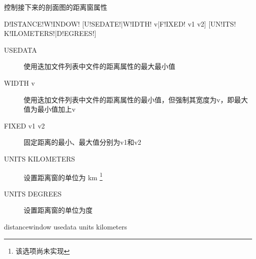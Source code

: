 \label{sss:distancewindow}

控制接下来的剖面图的距离窗属性

\begin{SACSTX}
D!ISTANCE!W!INDOW! [U!SEDATE!|W!IDTH! v|F!IXED! v1 v2] [UN!ITS! K!ILOMETERS!|D!EGREES!]
\end{SACSTX}

\begin{description}
\item [USEDATA] 使用迭加文件列表中文件的距离属性的最大最小值
\item [WIDTH v] 使用迭加文件列表中文件的距离属性的最小值，但强制其宽度为v，即最大值为最小值加上v
\item [FIXED v1 v2] 固定距离的最小、最大值分别为v1和v2
\item [UNITS KILOMETERS] 设置距离窗的单位为 \si{\km} \footnote{该选项尚未实现}
\item [UNITS DEGREES] 设置距离窗的单位为度
\end{description}

\begin{SACDFT}
distancewindow usedata units kilometers
\end{SACDFT}
